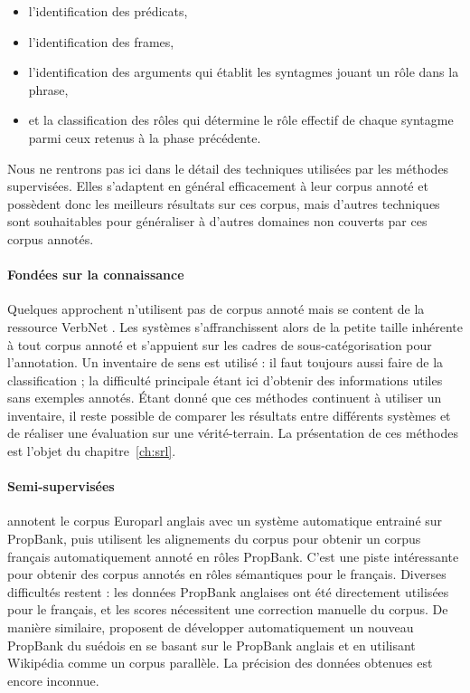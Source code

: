 \begin{itemize}
    \item l'identification des prédicats,
    \item l'identification des frames,
    \item l'identification des arguments qui établit les syntagmes jouant un rôle dans la phrase,
    \item et la classification des rôles qui détermine le rôle effectif de
chaque syntagme parmi ceux retenus à la phase précédente.
\end{itemize}

Nous ne rentrons pas ici dans le détail des techniques utilisées par les
méthodes supervisées. Elles s'adaptent en général efficacement à leur corpus
annoté et possèdent donc les meilleurs résultats sur ces corpus, mais d'autres
techniques sont souhaitables pour généraliser à d'autres domaines non couverts
par ces corpus annotés.


\paragraph{Fondées sur la connaissance}

Quelques approchent n'utilisent pas de corpus annoté mais se content de la
ressource VerbNet
\citep{swier2004unsupervised,swier2005exploiting,pradet2013revisiting}. Les
systèmes s'affranchissent alors de la petite taille inhérente à tout corpus
annoté et s'appuient sur les cadres de sous-catégorisation pour l'annotation.
Un inventaire de sens est utilisé : il faut toujours aussi faire de la
classification ; la difficulté principale étant ici d'obtenir des informations
utiles sans exemples annotés. Étant donné que ces méthodes continuent à
utiliser un inventaire, il reste possible de comparer les résultats entre
différents systèmes et de réaliser une évaluation sur une vérité-terrain. La
présentation de ces méthodes est l'objet du chapitre~\ref{ch:srl}.

\paragraph{Semi-supervisées}

\cite{vanderplas2014cross} annotent le corpus Europarl anglais avec un système
automatique entrainé sur PropBank, puis utilisent les alignements du corpus
pour obtenir un corpus français automatiquement annoté en rôles PropBank. C'est
une piste intéressante pour obtenir des corpus annotés en rôles sémantiques
pour le français. Diverses difficultés restent : les données PropBank anglaises
ont été directement utilisées pour le français, et les scores nécessitent une
correction manuelle du corpus. De manière similaire, \cite{exner2014using}
proposent de développer automatiquement un nouveau PropBank du suédois en se
basant sur le PropBank anglais et en utilisant Wikipédia comme un corpus
parallèle. La précision des données obtenues est encore inconnue.

